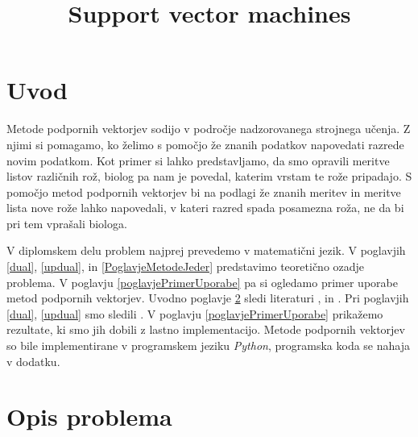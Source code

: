 \documentclass[mat1]{fmfdelo}
\title{Support vector machines}
\begin{document}
\section{Uvod}

Metode podpornih vektorjev sodijo v področje nadzorovanega strojnega učenja. Z njimi si pomagamo, ko želimo s pomočjo že znanih podatkov napovedati razrede novim podatkom.  Kot primer si lahko predstavljamo, da smo opravili meritve listov različnih rož, biolog pa nam je povedal, katerim vrstam te rože pripadajo. S pomočjo metod podpornih vektorjev bi na podlagi že znanih meritev in meritve lista nove rože lahko napovedali, v kateri razred spada posamezna roža, ne da bi pri tem vprašali biologa.

V diplomskem delu problem najprej prevedemo v matematični jezik. V poglavjih \ref{dual}, \ref{updual}, in \ref{PoglavjeMetodeJeder} predstavimo teoretično ozadje problema. V poglavju \ref{poglavjePrimerUporabe} pa si ogledamo primer uporabe metod podpornih vektorjev. Uvodno poglavje \ref{poglavjeOpisProblema} sledi literaturi \cite[str. 337--356]{DM}, \cite[str. 417--426]{ESL} in \cite[str. 214--235]{AITSL}. Pri poglavjih \ref{dual}, \ref{updual} smo sledili \cite{ITNO}. V poglavju \ref{poglavjePrimerUporabe} prikažemo rezultate, ki smo jih dobili z lastno implementacijo. Metode podpornih vektorjev so bile implementirane v programskem jeziku \emph{Python}, programska koda se nahaja v dodatku. 


\section{Opis problema}
\label{poglavjeOpisProblema}
\end{document}
